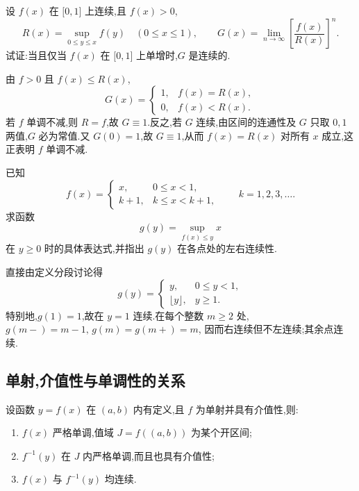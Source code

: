 \begin{example}
    设 $f(x)$ 在 $\lbrack 0,1\rbrack$ 上连续,且 $f(x)>0$,
    \[
        R(x)=\sup\limits_{0\leq y\leq x}f(y)\quad(0\leq x\leq1),
        \qquad
        G(x)=\lim\limits_{n\to\infty}\left[\dfrac{f(x)}{R(x)}\right]^n.
    \]
    试证:当且仅当 $f(x)$ 在 $\lbrack 0,1\rbrack$ 上单增时,$G$ 是连续的.
\end{example}
\exampleblank

\begin{solution}
    由 $f>0$ 且 $f(x)\leq R(x)$,
    \[
        G(x)= \begin{cases} 1, & f(x)=R(x), \\ 0, & f(x)<R(x). \end{cases}
    \]
    若 $f$ 单调不减,则 $R=f$,故 $G\equiv1$.反之,若 $G$ 连续,由区间的连通性及 $G$ 只取 $0,1$ 两值,$G$ 必为常值.又 $G(0)=1$,故 $G\equiv1$,从而 $f(x)=R(x)$ 对所有 $x$ 成立,这正表明 $f$ 单调不减.
\end{solution}

\begin{example}
    已知
    \[
        f(x)=
        \begin{cases}
            x,   & 0\leq x<1,   \\
            k+1, & k\leq x<k+1,
        \end{cases}
        \qquad k=1,2,3,\ldots.
    \]
    求函数
    \[
        g(y)=\sup\limits_{f(x)\leq y}x
    \]
    在 $y\geq0$ 时的具体表达式,并指出 $g(y)$ 在各点处的左右连续性.
\end{example}
\exampleblank

\begin{solution}
    直接由定义分段讨论得
    \[
        g(y)= \begin{cases} y,                & 0\leq y<1, \\ \lfloor y\rfloor, & y\geq1. \end{cases}
    \]
    特别地,$g(1)=1$,故在 $y=1$ 连续.在每个整数 $m\geq2$ 处, $g(m-)=m-1,\,g(m)=g(m+)=m$,
    因而右连续但不左连续;其余点连续.
\end{solution}



\subsection{单射,介值性与单调性的关系}

\begin{proposition}[\markstar]
    设函数 $y=f(x)$ 在 $(a,b)$ 内有定义,且 $f$ 为单射并具有介值性,则:
    \begin{enumerate}
        \item $f(x)$ 严格单调,值域 $J=f((a,b))$ 为某个开区间;
        \item $f^{-1}(y)$ 在 $J$ 内严格单调,而且也具有介值性;
        \item $f(x)$ 与 $f^{-1}(y)$ 均连续.
    \end{enumerate}
\end{proposition}

